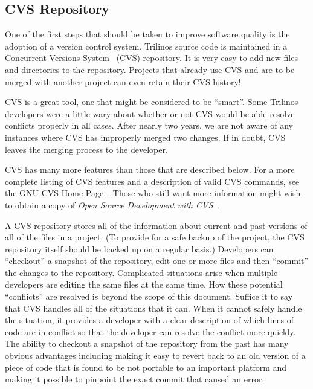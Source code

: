 \documentclass[12pt,relax]{article}
\begin{document}

\subsection{CVS Repository}

One of the first steps that should be taken to improve software quality is the 
adoption of a version control system.  Trilinos source code is maintained in a 
Concurrent Versions System~\cite{CVS}
(CVS) repository.  It is very easy to add new files and directories to
the repository.  Projects that already use CVS and are to be merged with 
another project can even retain their CVS history!

CVS is a great tool, one that might be considered to be ``smart''.  Some 
Trilinos developers were a little wary about whether or not CVS would be able
resolve conflicts properly in all cases.  After nearly two years, we are
not aware of any instances where CVS has improperly merged two changes.  If in 
doubt, CVS leaves the merging process to the developer.

CVS has many more features than those that are described below.  For a more 
complete listing of CVS features and a description of valid CVS commands, 
see the GNU CVS Home Page~\cite{CVS}.  Those who still want more information 
might wish to obtain a copy of 
{\it Open Source Development with CVS}~\cite{FogelBarCVS}.

A CVS repository stores all of the information about current and past versions
of all of the files in a project.  (To provide for a safe backup of the 
project, the CVS repository itself should be backed up on a regular basis.)  
Developers can ``checkout'' a snapshot of 
the repository, edit one or more files and then ``commit'' the changes to the
repository.  Complicated situations arise when multiple developers are 
editing the same files at the same time.  How these potential ``conflicts'' 
are resolved is beyond the scope of this document.  Suffice it to say that 
CVS handles all of the situations that it can.  When it cannot safely handle 
the situation, it provides a developer with a clear description of which 
lines of code are in conflict so that the developer can resolve the 
conflict more quickly.  The ability to checkout a snapshot of the 
repository from the past has many obvious advantages including making it easy 
to revert back to an old version of a piece of code that is found to be not 
portable to an important platform and making it possible to pinpoint the exact 
commit that caused an error.
\end{document}
